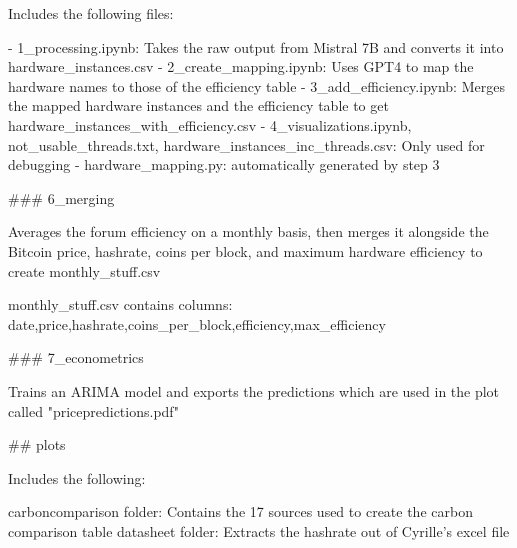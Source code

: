 Includes the following files:

- 1_processing.ipynb: Takes the raw output from Mistral 7B and converts it into hardware_instances.csv
- 2_create_mapping.ipynb: Uses GPT4 to map the hardware names to those of the efficiency table
- 3_add_efficiency.ipynb: Merges the mapped hardware instances and the efficiency table to get hardware_instances_with_efficiency.csv
- 4_visualizations.ipynb, not_usable_threads.txt, hardware_instances_inc_threads.csv: Only used for debugging
- hardware_mapping.py: automatically generated by step 3

### 6_merging

Averages the forum efficiency on a monthly basis, then merges it alongside the Bitcoin price, hashrate, coins per block, and maximum hardware efficiency to create monthly_stuff.csv

monthly_stuff.csv contains columns: date,price,hashrate,coins_per_block,efficiency,max_efficiency

### 7_econometrics

Trains an ARIMA model and exports the predictions which are used in the plot called "pricepredictions.pdf"


## plots

Includes the following:

carboncomparison folder: Contains the 17 sources used to create the carbon comparison table
datasheet folder: Extracts the hashrate out of Cyrille's excel file
